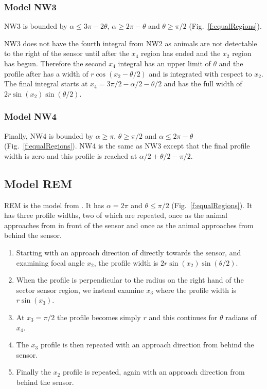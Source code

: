 \subsubsection{Model NW3} \label{NW3}

NW3 is bounded by $\alpha \le 3\pi - 2\theta$, $\alpha\ge 2\pi-\theta$ and $\theta\ge\pi/2$ (Fig.~\ref{f:equalRegions}).

NW3 does not have the fourth integral from NW2 as animals are not detectable to the right of the sensor until after the $x_4$ region has ended and the $x_2$ region has begun. Therefore the second $x_4$ integral has an upper limit of $\theta $ and the profile after has a width of $r\cos(x_2 - \theta/2)$ and is integrated with respect to $x_2$. The final integral starts at $x_4 = 3\pi/2 - \alpha/2 - \theta/2$ and has the full width of $2r\sin(x_2)\sin(\theta/2)$.



\subsubsection{Model NW4} \label{NW4}

Finally, NW4 is bounded by $\alpha\ge \pi$, $\theta\ge \pi/2$ and $\alpha \le 2\pi - \theta$ (Fig.~\ref{f:equalRegions}). NW4 is the same as NW3 except that the final profile width is zero and this profile is reached at $\alpha/2+\theta/2-\pi/2$. 




\subsection{Model REM} \label{REM}

REM is the model from \cite{rowcliffe2008estimating}. It has $\alpha =2\pi$ and $\theta \le \pi/2$ (Fig.~\ref{f:equalRegions}). It has three profile widths, two of which are repeated, once as the animal approaches from in front of the sensor and once as the animal approaches from behind the sensor.

\begin{enumerate}
\item Starting with an approach direction of directly towards the sensor, and examining focal angle $x_2$, the profile width is $2r\sin(x_2)\sin(\theta/2)$. 
\item When the profile is perpendicular to the radius on the right hand of the sector sensor region, we instead examine $x_3$ where the profile width is $r\sin(x_3)$.
\item At $x_3=\pi/2$ the profile becomes simply $r$ and this continues for $\theta $ radians of $x_4$. 
\item The $x_3$ profile is then repeated with an approach direction from behind the sensor. 
\item Finally the $x_2$ profile is repeated, again with an approach direction from behind the sensor. 
\end{enumerate}

